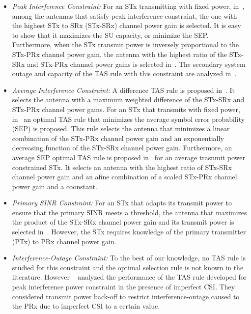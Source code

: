 \documentclass[12pt,draftcls,peerreview,onecolumn]{IEEEtran}
\begin{document}
\begin{itemize}
\item {\em Peak Interference Constraint:} For an STx transmitting with fixed power, in~\cite{Hanif_2015_globecom}, among the antennas that satisfy peak interference constraint, the one with the highest STx to SRx (STx-SRx) channel power gain is selected. It is easy to show that it maximizes the SU capacity, or minimize the SEP. Furthermore, when the STx transmit power is inversely proportional to the STx-PRx channel power gain, the antenna with the highest ratio of the STx-SRx and STx-PRx channel power gains is selected in~\cite{Wang_2010_TWC}. The secondary system outage and capacity of the TAS rule with this constraint are analyzed in~\cite{Kong_2011_JCN,Fakhan_2014_TSP,Asaduzzaman_2010_IET}.
%
\item {\em Average Interference Constraint:} A difference TAS rule is proposed in~\cite{Wang_2011_TCom}. It selects the antenna with a maximum weighted difference of the STx-SRx and STx-PRx channel power gains. For an STx that transmits with fixed power, in~\cite{Sarvendranath_2013_TCOM} an optimal TAS rule that minimizes the average symbol error probability (SEP) is proposed. This rule selects the antenna that minimizes a linear combination of the STx-PRx channel power gain and an exponentially decreasing function of the STx-SRx channel power gain. Furthermore, an average SEP optimal TAS rule is proposed in~\cite{Sarvendranath_2014_TCOM} for an average trasnmit power constrained STx. It selects an antenna   with the highest ratio of STx-SRx channel power gain and an afine combination of a scaled STx-PRx channel power gain and a coonstant. 

%
\item {\em Primary SINR Constraint:} For an STx that adapts its transmit power to ensure that the primary SINR meets a threshold, the antenna that maximizes the product of the STx-SRx channel power gain and its transmit power is selected in~\cite{Dmochowski_2011_CROWNCOM}. However, the STx requires knowledge of the primary transmitter (PTx) to PRx channel power gain.  

\item{\em Interference-Outage Constraint:} To the best of our knowledge, no TAS rule is studied for this constraint and the optimal selection rule is not known in the literature. However ~\cite{Peng_2016_eurasip} analyzed the performance of the TAS rule developed for peak interference power constraint in the presence of imperfect CSI. They considered transmit power back-off to restrict interference-outage caused to the PRx due to imperfect CSI to a certain value.

\end{itemize}
\end{document}
